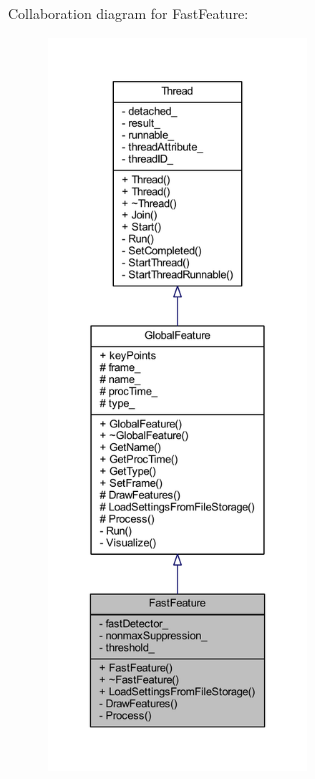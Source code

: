 Collaboration diagram for Fast\-Feature\-:
\nopagebreak
\begin{figure}[H]
\begin{center}
\leavevmode
\includegraphics[height=550pt]{class_fast_feature__coll__graph}
\end{center}
\end{figure}
